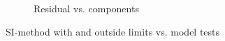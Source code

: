 \begin{figure}[H]
\begin{subfigure}[b]{0.48\textwidth}
        \caption{Residual vs. components}
        \label{fig:component_residual}
    \end{subfigure}
    \caption{SI-method with and outside limits vs. model tests}
    
\end{figure}




